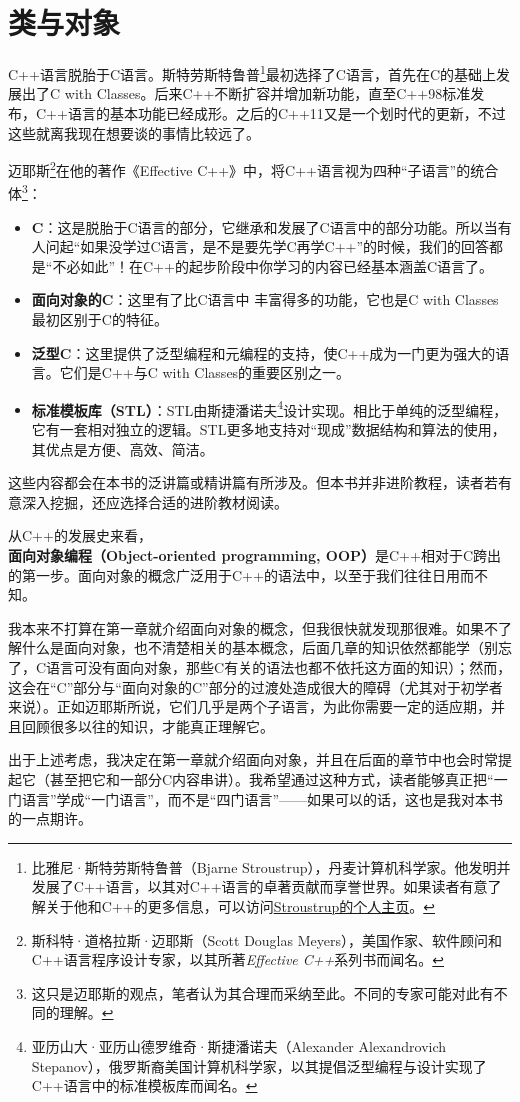 \section{类与对象}
C++语言脱胎于C语言。斯特劳斯特鲁普\footnote{比雅尼·斯特劳斯特鲁普（Bjarne Stroustrup），丹麦计算机科学家。他发明并发展了C++语言，以其对C++语言的卓著贡献而享誉世界。如果读者有意了解关于他和C++的更多信息，可以访问\href{https://www.stroustrup.com/}{Stroustrup的个人主页}。}最初选择了C语言，首先在C的基础上发展出了C with Classes。后来C++不断扩容并增加新功能，直至C++98标准发布，C++语言的基本功能已经成形。之后的C++11又是一个划时代的更新，不过这些就离我现在想要谈的事情比较远了。\par
迈耶斯\footnote{斯科特·道格拉斯·迈耶斯（Scott Douglas Meyers），美国作家、软件顾问和C++语言程序设计专家，以其所著\textit{Effective C++}系列书而闻名。}在他的著作《Effective C++》中，将C++语言视为四种``子语言''的统合体\footnote{这只是迈耶斯的观点，笔者认为其合理而采纳至此。不同的专家可能对此有不同的理解。}：
\begin{itemize}
    \item \textbf{C}：这是脱胎于C语言的部分，它继承和发展了C语言中的部分功能。所以当有人问起``如果没学过C语言，是不是要先学C再学C++''的时候，我们的回答都是``不必如此''！在C++的起步阶段中你学习的内容已经基本涵盖C语言了。
    \item \textbf{面向对象的C}：这里有了比C语言中 \lstinline@struct@ 丰富得多的功能，它也是C with Classes最初区别于C的特征。
    \item \textbf{泛型C}：这里提供了泛型编程和元编程的支持，使C++成为一门更为强大的语言。它们是C++与C with Classes的重要区别之一。
    \item \textbf{标准模板库（STL）}：STL由斯捷潘诺夫\footnote{亚历山大·亚历山德罗维奇·斯捷潘诺夫（Alexander Alexandrovich Stepanov），俄罗斯裔美国计算机科学家，以其提倡泛型编程与设计实现了C++语言中的标准模板库而闻名。}设计实现。相比于单纯的泛型编程，它有一套相对独立的逻辑。STL更多地支持对``现成''数据结构和算法的使用，其优点是方便、高效、简洁。
\end{itemize}
这些内容都会在本书的泛讲篇或精讲篇有所涉及。但本书并非进阶教程，读者若有意深入挖掘，还应选择合适的进阶教材阅读。\par
从C++的发展史来看，\textbf{面向对象编程（Object-oriented programming, OOP）}是C++相对于C跨出的第一步。面向对象的概念广泛用于C++的语法中，以至于我们往往日用而不知。\par
我本来不打算在第一章就介绍面向对象的概念，但我很快就发现那很难。如果不了解什么是面向对象，也不清楚相关的基本概念，后面几章的知识依然都能学（别忘了，C语言可没有面向对象，那些C有关的语法也都不依托这方面的知识）；然而，这会在``C''部分与``面向对象的C''部分的过渡处造成很大的障碍（尤其对于初学者来说）。正如迈耶斯所说，它们几乎是两个子语言，为此你需要一定的适应期，并且回顾很多以往的知识，才能真正理解它。\par
出于上述考虑，我决定在第一章就介绍面向对象，并且在后面的章节中也会时常提起它（甚至把它和一部分C内容串讲）。我希望通过这种方式，读者能够真正把``一门语言''学成``一门语言''，而不是``四门语言''——如果可以的话，这也是我对本书的一点期许。\par
